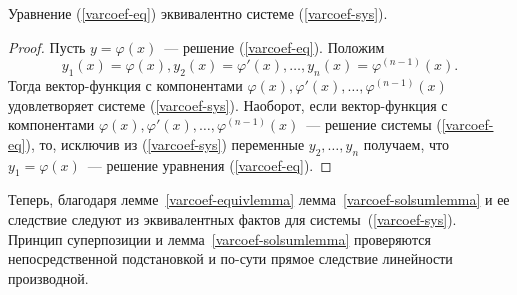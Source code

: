 \begin{lemma}\label{varcoef-equivlemma}
Уравнение (\ref{varcoef-eq}) эквивалентно системе (\ref{varcoef-sys}).
\end{lemma}
\begin{proof}
Пусть \(y = \varphi(x)\)~--- решение (\ref{varcoef-eq}). Положим
\[y_1(x) = \varphi(x), y_2(x) = \varphi'(x), \ldots, y_n(x) = \varphi^{(n-1)}(x).\]
Тогда вектор-функция с компонентами \(\varphi(x), \varphi'(x), \ldots, \varphi^{(n-1)}(x)\) удовлетворяет системе (\ref{varcoef-sys}). Наоборот, если вектор-функция с компонентами \(\varphi(x), \varphi'(x), \ldots, \varphi^{(n-1)}(x)\)~--- решение системы (\ref{varcoef-eq}), то, исключив из (\ref{varcoef-sys}) переменные \(y_2, \ldots,y_n\) получаем, что \(y_1 = \varphi(x)\)~--- решение уравнения (\ref{varcoef-eq}).
\end{proof}

Теперь, благодаря лемме~\ref{varcoef-equivlemma} лемма~\ref{varcoef-solsumlemma} и ее следствие следуют из эквивалентных фактов для системы~(\ref{varcoef-sys}). Принцип суперпозиции и лемма~\ref{varcoef-solsumlemma}  проверяются непосредственной подстановкой и по-сути прямое следствие линейности производной.